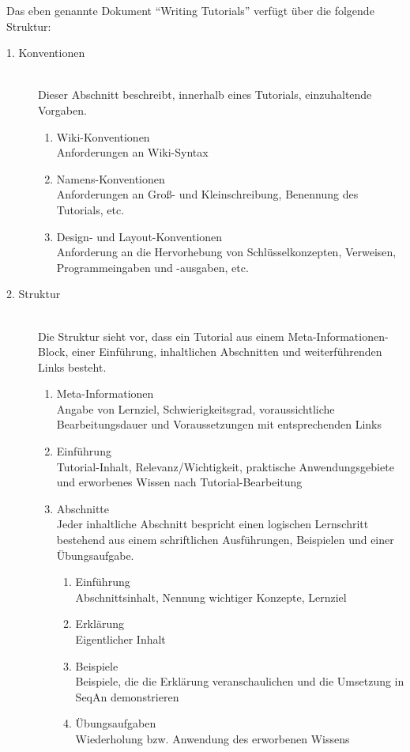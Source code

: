 Das eben genannte Dokument ``Writing Tutorials'' verfügt über die folgende Struktur:
\begin{description}
  \item[1. Konventionen] \hfill \\
  Dieser Abschnitt beschreibt, innerhalb eines Tutorials, einzuhaltende Vorgaben.
  \begin{enumerate}
    \item Wiki-Konventionen\\Anforderungen an Wiki-Syntax
    \item Namens-Konventionen\\Anforderungen an Groß- und Kleinschreibung, Benennung des Tutorials, etc.
    \item Design- und Layout-Konventionen\\Anforderung an die Hervorhebung von Schlüsselkonzepten, Verweisen, Programmeingaben und -ausgaben, etc.
  \end{enumerate}
  
  \item[2. Struktur] \hfill \\
  Die Struktur sieht vor, dass ein Tutorial aus einem Meta-Informationen-Block, einer Einführung, inhaltlichen Abschnitten und weiterführenden Links besteht.
  \begin{enumerate}
    \item Meta-Informationen\\Angabe von Lernziel, Schwierigkeitsgrad, voraussichtliche Bearbeitungsdauer und Voraussetzungen mit entsprechenden Links
    \item Einführung\\Tutorial-Inhalt, Relevanz/Wichtigkeit, praktische Anwendungsgebiete und erworbenes Wissen nach Tutorial-Bearbeitung
    \item Abschnitte\\Jeder inhaltliche Abschnitt bespricht einen logischen Lernschritt bestehend aus einem schriftlichen Ausführungen, Beispielen und einer Übungsaufgabe.
    \begin{enumerate}
      \item Einführung\\Abschnittsinhalt, Nennung wichtiger Konzepte, Lernziel
      \item Erklärung\\Eigentlicher Inhalt
      \item Beispiele\\Beispiele, die die Erklärung veranschaulichen und die Umsetzung in SeqAn demonstrieren
      \item Übungsaufgaben\\Wiederholung bzw. Anwendung des erworbenen Wissens
    \end{enumerate}
  \end{enumerate}
  

\end{description}
